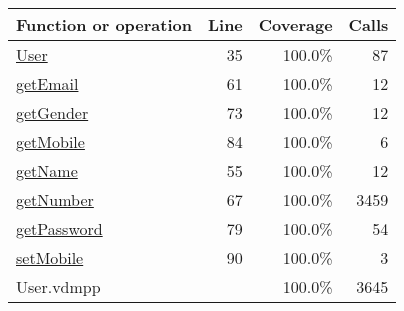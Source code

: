\bigskip
\begin{longtable}{|l|r|r|r|}
\hline
Function or operation & Line & Coverage & Calls \\
\hline
\hline
\hyperref[User:35]{User} & 35&100.0\% & 87 \\
\hline
\hyperref[getEmail:61]{getEmail} & 61&100.0\% & 12 \\
\hline
\hyperref[getGender:73]{getGender} & 73&100.0\% & 12 \\
\hline
\hyperref[getMobile:84]{getMobile} & 84&100.0\% & 6 \\
\hline
\hyperref[getName:55]{getName} & 55&100.0\% & 12 \\
\hline
\hyperref[getNumber:67]{getNumber} & 67&100.0\% & 3459 \\
\hline
\hyperref[getPassword:79]{getPassword} & 79&100.0\% & 54 \\
\hline
\hyperref[setMobile:90]{setMobile} & 90&100.0\% & 3 \\
\hline
\hline
User.vdmpp & & 100.0\% & 3645 \\
\hline
\end{longtable}

